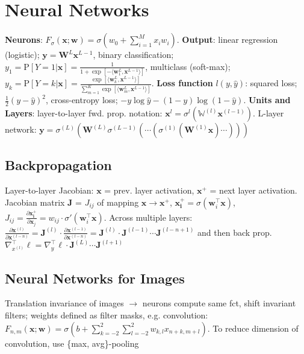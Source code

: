 \section{Neural Networks}
\textbf{Neurons}: $F_\sigma(\mathbf{x};\mathbf{w}) = \sigma(w_0 + \sum_{i=1}^M{x_iw_i})$. \textbf{Output}: linear regression (logistic); $\mathbf{y} = \mathbf{W}^L\mathbf{x}^{L-1}$, binary classification; $y_1 = \text{P}[Y=1|\mathbf{x}] = \frac{1}{1 + \exp[-\langle \mathbf{w}_1^L,\mathbf{x}^{L-1}\rangle]}$, multiclass (soft-max); $y_k = \text{P}[Y=k|\mathbf{x}]= \frac{\exp[\langle \mathbf{w}_k^L,\mathbf{x}^{L-1}\rangle]}{\sum_{m=1}^{K}{\exp[\langle \mathbf{w}_m^L, \mathbf{x}^{L-1}\rangle]}}$. \textbf{Loss function} $l(y, \hat{y})$: squared loss; $\frac{1}{2}(y - \hat{y})^2$, cross-entropy loss; $-y \log \hat{y} - (1-y)\log(1-\hat{y})$. \textbf{Units and Layers}: layer-to-layer fwd. prop. notation: $\mathbf{x}^{l} = \sigma^{l}\left(\mathbb{W}^{\left(l\right)}\mathbf{x}^{\left(l-1\right)}\right)$. L-layer network: $\mathbf{y}=\sigma^{\left(L\right)}\left(\mathbf{W}^(L)\sigma^{(L-1)}\left(\cdots\left(\sigma^{(1)}\left(\mathbf{W}^{(1)}\mathbf{x}\right)\cdots\right)\right)\right)$

\subsection*{Backpropagation}
Layer-to-layer Jacobian: $\mathbf{x}$ = prev. layer activation, $\mathbf{x^+}$ = next layer activation. Jacobian matrix $\mathbf{J}$ = $J_{ij}$ of mapping $\mathbf{x}\rightarrow\mathbf{x^+}$, $\mathbf{x_i^+} = \sigma(\mathbf{w}_i^\top\mathbf{x})$, $J_{ij} = \frac{\partial \mathbf{x_i^+}}{\partial \mathbf{x}_j} = w_{ij}\cdot\sigma'(\mathbf{w}_i^\top\mathbf{x})$. Across multiple layers: $\frac{\partial\mathbf{x}^{(l)}}{\partial\mathbf{x}^{(l-n)}} = \mathbf{J}^{(l)}\cdot\frac{\partial\mathbf{x}^{(l-1)}}{\partial\mathbf{x}^{(l-n)}}=\mathbf{J}^{(l)}\cdot\mathbf{J}^{(l-1)}\cdots\mathbf{J}^{(l-n+1)}$ and then back prop. $ \nabla_{x^{(l)}}^\top\ell=\nabla_{y}^\top\ell\cdot\mathbf{J}^{(L)}\cdots\mathbf{J}^{(l+1)}$

\subsection*{Neural Networks for Images}
Translation invariance of images $\rightarrow$ neurons compute same fct, shift invariant filters; weights defined as filter masks, e.g. convolution: $F_{n,m}(\mathbf{x};\mathbf{w}) = \sigma(b + \sum_{k=-2}^2\sum_{l=-2}^{2}{w_{k,l}x_{n+k,m+l}})$. To reduce dimension of convolution, use \{max, avg\}-pooling